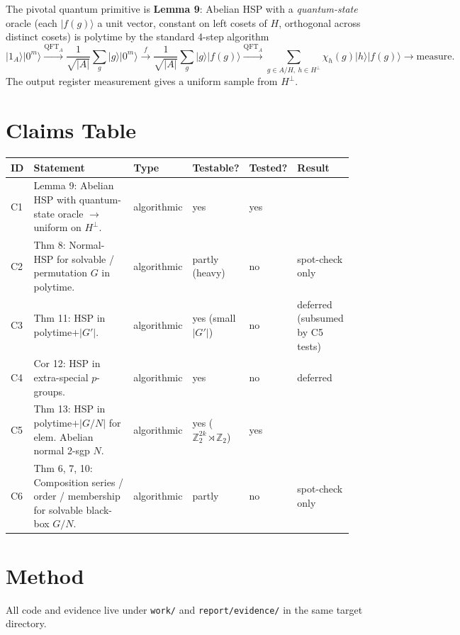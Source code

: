 \documentclass[11pt]{article}
\begin{document}
The pivotal quantum primitive is \textbf{Lemma 9}: Abelian HSP with a
\emph{quantum-state} oracle (each $\lvert f(g)\rangle$ a unit vector,
constant on left cosets of $H$, orthogonal across distinct cosets) is
polytime by the standard 4-step algorithm
\[
\lvert 1_A\rangle\lvert 0^m\rangle
\xrightarrow{\text{QFT}_A} \frac{1}{\sqrt{|A|}}\sum_g \lvert g\rangle\lvert 0^m\rangle
\xrightarrow{f} \frac{1}{\sqrt{|A|}}\sum_g \lvert g\rangle\lvert f(g)\rangle
\xrightarrow{\text{QFT}_A} \sum_{g \in A/H,\ h \in H^\perp} \chi_h(g)\lvert h\rangle\lvert f(g)\rangle
\rightarrow \text{measure}.
\]
The output register measurement gives a uniform sample from $H^\perp$.

\section{Claims Table}

\begin{longtable}{@{}p{0.06\linewidth}p{0.44\linewidth}p{0.15\linewidth}p{0.10\linewidth}p{0.10\linewidth}p{0.11\linewidth}@{}}
\toprule
ID & Statement & Type & Testable? & Tested? & Result \\
\midrule
C1 & Lemma 9: Abelian HSP with quantum-state oracle $\to$ uniform on $H^\perp$. & algorithmic & yes & yes & \textbf{\color{green!50!black}{PASS 20/20}} \\
C2 & Thm 8: Normal-HSP for solvable / permutation $G$ in polytime. & algorithmic & partly (heavy) & no & spot-check only \\
C3 & Thm 11: HSP in polytime$+|G'|$. & algorithmic & yes (small $|G'|$) & no & deferred (subsumed by C5 tests) \\
C4 & Cor 12: HSP in extra-special $p$-groups. & algorithmic & yes & no & deferred \\
C5 & Thm 13: HSP in polytime$+|G/N|$ for elem. Abelian normal 2-sgp $N$. & algorithmic & yes ($\mathbb{Z}_2^{2k}\rtimes\mathbb{Z}_2$) & yes & \textbf{\color{green!50!black}{PASS 24/24}} \\
C6 & Thm 6, 7, 10: Composition series / order / membership for solvable black-box $G/N$. & algorithmic & partly & no & spot-check only \\
\bottomrule
\end{longtable}

\section{Method}

All code and evidence live under
\texttt{work/} and \texttt{report/evidence/} in the same target directory.
\end{document}
